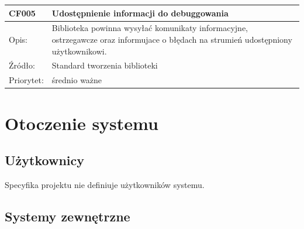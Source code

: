 \documentclass[a4paper,10pt]{article}
\begin{document}
\begin{center}
\begin{tabular}{|m{3cm}|m{9cm}|}
 \hline

CF005 & Udostępnienie informacji do debuggowania  \\ \hline
Opis: &  Biblioteka powinna wysyłać komunikaty informacyjne, ostrzegawcze oraz informujace o błędach na strumień udostępniony użytkownikowi.  \\ \hline
Źródło: & Standard tworzenia biblioteki 
 \\ \hline
Priorytet: & średnio ważne \\ \hline

\end{tabular}

\end{center}

\section{Otoczenie systemu}


\subsection{Użytkownicy}

Specyfika projektu nie definiuje użytkowników systemu.





\subsection{Systemy zewnętrzne}
\end{document}
